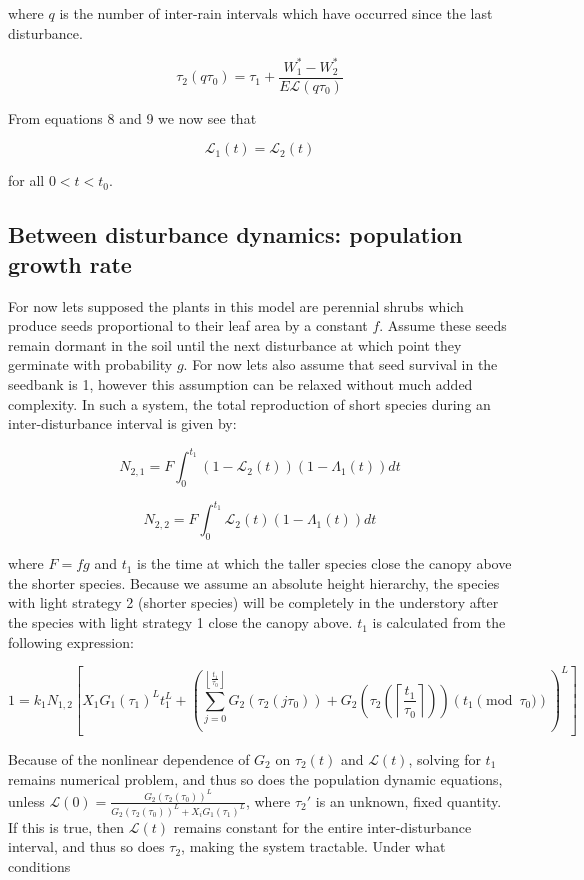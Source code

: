 \documentclass[11pt]{article}
\begin{document}
where \(q\) is the number of inter-rain intervals which have occurred since the last disturbance.

\begin{equation}
    \tau_2(q\tau_0) = \tau_1 + \frac{W_1^* - W_2^*}{E \mathcal{L}(q\tau_0)}
\end{equation}

From equations 8 and 9 we now see that

\begin{equation*}
    \mathcal{L}_1(t) = \mathcal{L}_2(t)
\end{equation*}

for all \(0 < t < t_0\).

\subsection{Between disturbance dynamics: population growth rate}
\label{sec:org942ab33}

For now lets supposed the plants in this model are perennial shrubs which produce seeds proportional to their leaf area by a constant \(f\). Assume these seeds remain dormant in the soil until the next disturbance at which point they germinate with probability \(g\). For now lets also assume that seed survival in the seedbank is 1, however this assumption can be relaxed without much added complexity. In such a system, the total reproduction of short species during an inter-disturbance interval is given by:

\begin{equation}
    N_{2,1} = F \int_{0}^{t_1} (1-\mathcal{L}_2(t)) (1 - \Lambda_{1}(t))dt
\end{equation}

\begin{equation}
    N_{2,2} = F \int_{0}^{t_1} \mathcal{L}_2(t) (1 - \Lambda_{1}(t))dt
\end{equation}

where \(F = fg\) and \(t_1\) is the time at which the taller species close the canopy above the shorter species. Because we assume an absolute height hierarchy, the species with light strategy 2 (shorter species) will be completely in the understory after the species with light strategy 1 close the canopy above. \(t_1\) is calculated from the following expression:

\begin{equation*}
    1 = k_1 N_{1,2} \left[X_1 G_1(\tau_1)^L t_1^L + \left( \sum_{j=0}^{\left\lfloor \frac{t_1}{\tau_0}\right\rfloor} G_2(\tau_2(j \tau_0)) + G_2\left(\tau_2\left(\left\lceil \frac{t_1}{\tau_0}\right\rceil\right)\right) \left(t_1 \pmod{\tau_0} \right) \right)^L \right]
\end{equation*}

Because of the nonlinear dependence of \(G_2\) on \(\tau_2(t)\) and \(\mathcal{L}(t)\), solving for \(t_1\) remains numerical problem, and thus so does the population dynamic equations, unless \(\mathcal{L}(0) = \frac{G_2(\tau_2(\tau_0))^L}{G_2(\tau_2(\tau_0))^L + X_i G_1(\tau_1)^L}\), where \(\tau_2'\) is an unknown, fixed quantity. If this is true, then \(\mathcal{L}(t)\) remains constant for the entire inter-disturbance interval, and thus so does \(\tau_2\), making the system tractable. Under what conditions
\end{document}
